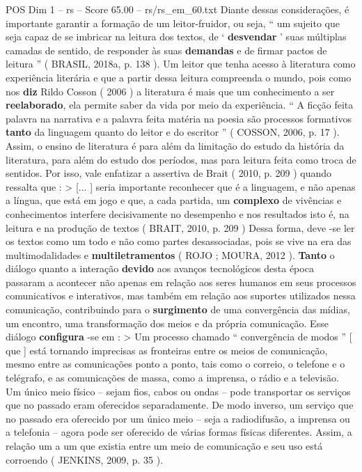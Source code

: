 \begin{textsample}{POS Dim 1 – rs – Score 65.00 – rs/rs\_em\_60.txt}
Diante dessas considerações, é importante garantir a formação de um leitor-fruidor, ou seja, “ um sujeito que seja capaz de se imbricar na leitura dos textos, de ‘ \textbf{desvendar} ’ suas múltiplas camadas de sentido, de responder às suas \textbf{demandas} e de firmar pactos de leitura ” ( BRASIL, 2018a, p. 138 ).
Um leitor que tenha acesso à literatura como experiência literária e que a partir dessa leitura compreenda o mundo, pois como nos \textbf{diz} Rildo Cosson ( 2006 ) a literatura é mais que um conhecimento a ser \textbf{reelaborado}, ela permite saber da vida por meio da experiência. “ A ficção feita palavra na narrativa e a palavra feita matéria na poesia são processos formativos \textbf{tanto} da linguagem quanto do leitor e do escritor ” ( COSSON, 2006, p. 17 ).
Assim, o ensino de literatura é para além da limitação do estudo da história da literatura, para além do estudo dos períodos, mas para leitura feita como troca de sentidos.
Por isso, vale enfatizar a assertiva de Brait ( 2010, p. 209 ) quando ressalta que : > [... ] seria importante reconhecer que é a linguagem, e não apenas a língua, que está em jogo e que, a cada partida, um \textbf{complexo} de vivências e conhecimentos interfere decisivamente no desempenho e nos resultados isto é, na leitura e na produção de textos ( BRAIT, 2010, p. 209 ) Dessa forma, deve -se ler os textos como um todo e não como partes desassociadas, pois se vive na era das multimodalidades e \textbf{multiletramentos} ( ROJO ; MOURA, 2012 ). \textbf{Tanto} o diálogo quanto a interação \textbf{devido} aos avanços tecnológicos desta época passaram a acontecer não apenas em relação aos seres humanos em seus processos comunicativos e interativos, mas também em relação aos suportes utilizados nessa comunicação, contribuindo para o \textbf{surgimento} de uma convergência das mídias, um encontro, uma transformação dos meios e da própria comunicação.
Esse diálogo \textbf{configura} -se em : > Um processo chamado “ convergência de modos ” [ que ] está tornando imprecisas as fronteiras entre os meios de comunicação, mesmo entre as comunicações ponto a ponto, tais como o correio, o telefone e o telégrafo, e as comunicações de massa, como a imprensa, o rádio e a televisão.
Um único meio físico – sejam fios, cabos ou ondas – pode transportar os serviços que no passado eram oferecidos separadamente.
De modo inverso, um serviço que no passado era oferecido por um único meio – seja a radiodifusão, a imprensa ou a telefonia – agora pode ser oferecido de várias formas físicas diferentes.
Assim, a relação um a um que existia entre um meio de comunicação e seu uso está corroendo ( JENKINS, 2009, p. 35 ).

\end{textsample}

